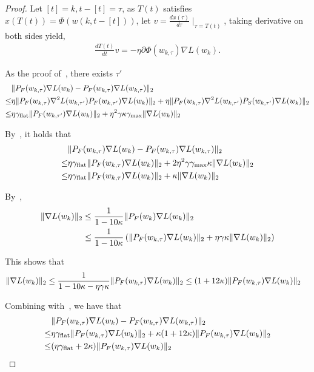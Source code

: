 \begin{proof}
Let $[t] = k, t- [t] = \tau$, as $T(t)$ satisfies $x(T(t)) = \Phi(w(k, t - [t]))$, let $v = \frac{d x(\tau)}{d \tau} \mid_{\tau = T(t)}$, taking derivative on both sides yield,
\begin{align*}
    \frac{d T(t)}{d t} v = -\eta \partial \Phi(w_{k, \tau}) \nabla L(w_k).
\end{align*}


As the proof of~, there exists $\tau'$
\begin{align*}
    &\| {P}_F(w_{k, \tau}) \nabla L(w_k)  - {P}_F(w_{k, \tau}) \nabla L(w_{k, \tau}) \|_2 \\
    \le& \eta  \| {P}_F(w_{k, \tau}) \nabla^2 L(w_{k, \tau'}) {P}_F (w_{k, \tau'}) \nabla L(w_k) \|_2  + \eta \| {P}_F(w_{k, \tau}) \nabla^2 L(w_{k, \tau'}) {P}_S (w_{k, \tau'}) \nabla L(w_k) \|_2 \\
    \le& \eta \gamma_{\mathrm{flat}} \|{P}_F (w_{k, \tau'}) \nabla L(w_k) \|_2 + \eta^2 \gamma \kappa \gamma_{\mathrm{max}} \| \nabla L(w_k)\|_2
\end{align*}

By~, it holds that
\begin{align}
&\| {P}_F(w_{k, \tau}) \nabla L(w_k)  - {P}_F(w_{k, \tau}) \nabla L(w_{k, \tau}) \|_2 \notag \\
\le& \eta \gamma_{\mathrm{flat}} \|{P}_F (w_{k, \tau}) \nabla L(w_k) \|_2 + 2\eta^2 \gamma \gamma_{\mathrm{max}} \kappa \| \nabla L(w_k)\|_2 \notag \\
\le& \eta \gamma_{\mathrm{flat}} \|{P}_F (w_{k, \tau}) \nabla L(w_k) \|_2 + \kappa \| \nabla L(w_k)\|_2\label{eq:fpg1fpg} 
\end{align}

By~, 
\begin{align*}
    \| \nabla L(w_k)\|_2 &\le \frac{1}{1 - 10 \kappa} \| {P}_F(w_k) \nabla L(w_k)\|_2 \\
    &\le \frac{1}{1 - 10 \kappa} \left(   \|{P}_F (w_{k, \tau}) \nabla L(w_k) \|_2 + \eta \gamma \kappa \| \nabla L(w_k) \|_2 \right)
\end{align*}

This shows that 
\begin{align*}
    \| \nabla L(w_k)\|_2 &\le  \frac{1}{1 - 10 \kappa - \eta \gamma \kappa}  \|{P}_F (w_{k, \tau}) \nabla L(w_k) \|_2 \le (1 + 12 \kappa) \|{P}_F (w_{k, \tau}) \nabla L(w_k) \|_2 
\end{align*}

Combining with~, we have that
\begin{align}
    &\| {P}_F(w_{k, \tau}) \nabla L(w_k)  - {P}_F(w_{k, \tau}) \nabla L(w_{k, \tau}) \|_2  \notag\\
    \le& \eta \gamma_{\mathrm{flat}} \|{P}_F (w_{k, \tau}) \nabla L(w_k) \|_2 + \kappa(1 + 12 \kappa) \|{P}_F (w_{k, \tau}) \nabla L(w_k) \|_2  \notag\\
    \le& (\eta \gamma_{\mathrm{flat}} + 2\kappa) \|{P}_F (w_{k, \tau}) \nabla L(w_k) \|_2 \notag
\end{align}


\end{proof}
